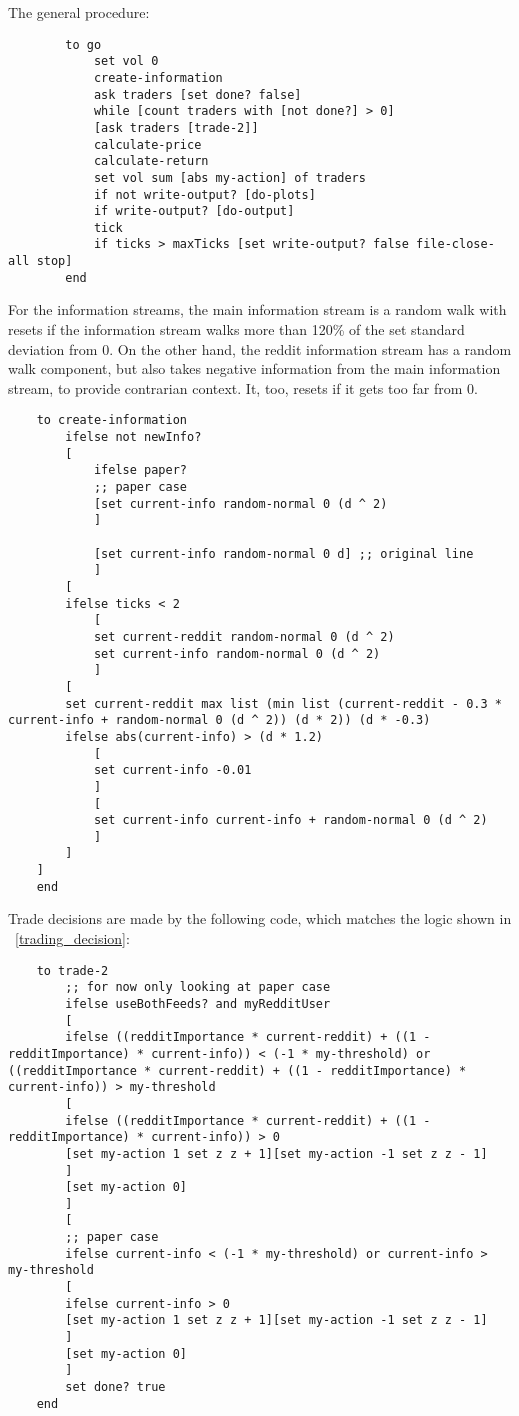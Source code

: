 \documentclass[a4paper, 11pt]{report}
\begin{document}
	The general procedure:
	\begin{lstlisting}
		to go
			set vol 0
			create-information
			ask traders [set done? false]
			while [count traders with [not done?] > 0]
			[ask traders [trade-2]]
			calculate-price
			calculate-return
			set vol sum [abs my-action] of traders
			if not write-output? [do-plots]
			if write-output? [do-output]
			tick
			if ticks > maxTicks [set write-output? false file-close-all stop]
		end
	\end{lstlisting}
	
	\noindent For the information streams, the main information stream is a random walk with resets if the information stream walks more than 120\% of the set standard deviation from 0. On the other hand, the reddit information stream has a random walk component, but also takes negative information from the main information stream, to provide contrarian context. It, too, resets if it gets too far from 0.
	
	\begin{lstlisting}
	to create-information
		ifelse not newInfo?
		[
			ifelse paper?
			;; paper case
			[set current-info random-normal 0 (d ^ 2)
			]
	
			[set current-info random-normal 0 d] ;; original line
			]
		[
		ifelse ticks < 2
			[
			set current-reddit random-normal 0 (d ^ 2)
			set current-info random-normal 0 (d ^ 2)
			]
		[
		set current-reddit max list (min list (current-reddit - 0.3 * current-info + random-normal 0 (d ^ 2)) (d * 2)) (d * -0.3)
		ifelse abs(current-info) > (d * 1.2)
			[
			set current-info -0.01
			]
			[
			set current-info current-info + random-normal 0 (d ^ 2)
			]
		]
	]
	end
	\end{lstlisting}
	
	\noindent Trade decisions are made by the following code, which matches the logic shown in ~\autoref{trading_decision}:
	\begin{lstlisting}
	to trade-2
		;; for now only looking at paper case
		ifelse useBothFeeds? and myRedditUser
		[
		ifelse ((redditImportance * current-reddit) + ((1 - redditImportance) * current-info)) < (-1 * my-threshold) or ((redditImportance * current-reddit) + ((1 - redditImportance) * current-info)) > my-threshold
		[
		ifelse ((redditImportance * current-reddit) + ((1 - redditImportance) * current-info)) > 0
		[set my-action 1 set z z + 1][set my-action -1 set z z - 1]
		]
		[set my-action 0]
		]
		[
		;; paper case
		ifelse current-info < (-1 * my-threshold) or current-info > my-threshold
		[
		ifelse current-info > 0
		[set my-action 1 set z z + 1][set my-action -1 set z z - 1]
		]
		[set my-action 0]
		]
		set done? true
	end
	\end{lstlisting}
	
\end{document}
